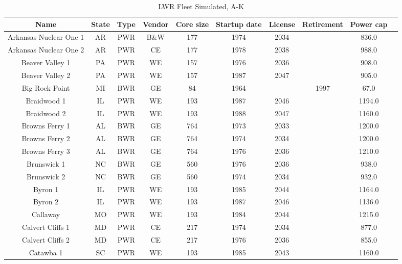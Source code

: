 \begin{table}[!h]
    \centering
    \caption{LWR Fleet Simulated, A-K}
    \label{tab:lwr_fleet_1}
    \begin{tabular}{c c c c c c c c c c}
    \hline
    \textbf{Name} & \textbf{State} & \textbf{Type} & \textbf{Vendor} & \textbf{Core size} & \textbf{Startup date} & \textbf{License} & \textbf{Retirement} & \textbf{Power cap} \\
    \hline
    Arkansas Nuclear One 1&AR & PWR & B\&W & 177 & 1974 & 2034 &      & 836.0 \\
    Arkansas Nuclear One 2&AR & PWR & CE   & 177 & 1978 & 2038 &      & 988.0 \\
    Beaver Valley 1       &PA & PWR & WE   & 157 & 1976 & 2036 &      & 908.0 \\
    Beaver Valley 2       &PA & PWR & WE   & 157 & 1987 & 2047 &      & 905.0 \\
    Big Rock Point        &MI & BWR & GE   & 84  & 1964 &      & 1997 & 67.0  \\
    Braidwood 1           &IL & PWR & WE   & 193 & 1987 & 2046 &      & 1194.0\\
    Braidwood 2           &IL & PWR & WE   & 193 & 1988 & 2047 &      & 1160.0\\
    Browns Ferry 1        &AL & BWR & GE   & 764 & 1973 & 2033 &      & 1200.0\\
    Browns Ferry 2        &AL & BWR & GE   & 764 & 1974 & 2034 &      & 1200.0\\
    Browns Ferry 3        &AL & BWR & GE   & 764 & 1976 & 2036 &      & 1210.0\\
    Brunswick 1           &NC & BWR & GE   & 560 & 1976 & 2036 &      & 938.0 \\
    Brunswick 2           &NC & BWR & GE   & 560 & 1974 & 2034 &      & 932.0 \\
    Byron 1               &IL & PWR & WE   & 193 & 1985 & 2044 &      & 1164.0\\
    Byron 2               &IL & PWR & WE   & 193 & 1987 & 2046 &      & 1136.0\\
    Callaway              &MO & PWR & WE   & 193 & 1984 & 2044 &      & 1215.0\\
    Calvert Cliffs 1      &MD & PWR & CE   & 217 & 1974 & 2034 &      & 877.0 \\
    Calvert Cliffs 2      &MD & PWR & CE   & 217 & 1976 & 2036 &      & 855.0 \\
    Catawba 1             &SC & PWR & WE   & 193 & 1985 & 2043 &      & 1160.0\\

\end{tabular}
\end{table}
